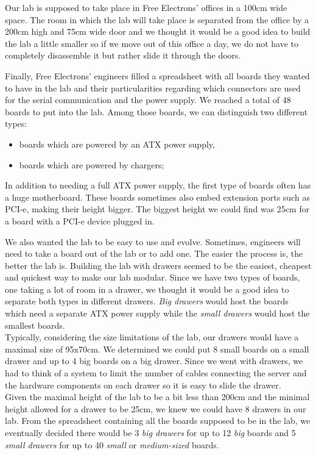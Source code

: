 Our lab is supposed to take place in Free Electrons' offices in a 100cm wide space. The room in which the lab will take place is separated from the office by a 200cm high and 75cm wide door and we thought it would be a good idea to build the lab a little smaller so if we move out of this office a day, we do not have to completely disassemble it but rather slide it through the doors.

Finally, Free Electrons' engineers filled a spreadsheet with all boards they wanted to have in the lab and their particularities regarding which connectors are used for the serial communication and the power supply. We reached a total of 48 boards to put into the lab. Among those boards, we can distinguish two different types:
\begin{itemize}
  \item boards which are powered by an ATX power supply,
  \item boards which are powered by chargers;
\end{itemize}

In addition to needing a full ATX power supply, the first type of boards often has a huge motherboard. These boards sometimes also embed extension ports such as PCI-e, making their height bigger. The biggest height we could find was 25cm for a board with a PCI-e device plugged in.

We also wanted the lab to be easy to use and evolve. Sometimes, engineers will need to take a board out of the lab or to add one. The easier the process is, the better the lab is. Building the lab with drawers seemed to be the easiest, cheapest and quickest way to make our lab modular. Since we have two types of boards, one taking a lot of room in a drawer, we thought it would be a good idea to separate both types in different drawers. \textit{Big drawers} would host the boards which need a separate ATX power supply while the \textit{small drawers} would host the smallest boards.\\
Typically, considering the size limitations of the lab, our drawers would have a maximal size of 95x70cm. We determined we could put 8 small boards on a small drawer and up to 4 big boards on a big drawer. Since we went with drawers, we had to think of a system to limit the number of cables connecting the server and the hardware components on each drawer so it is easy to slide the drawer.\\
Given the maximal height of the lab to be a bit less than 200cm and the minimal height allowed for a drawer to be 25cm, we knew we could have 8 drawers in our lab. From the spreadsheet containing all the boards supposed to be in the lab, we eventually decided there would be 3 \textit{big drawers} for up to 12 \textit{big} boards and 5 \textit{small drawers} for up to 40 \textit{small} or \textit{medium-sized} boards.


